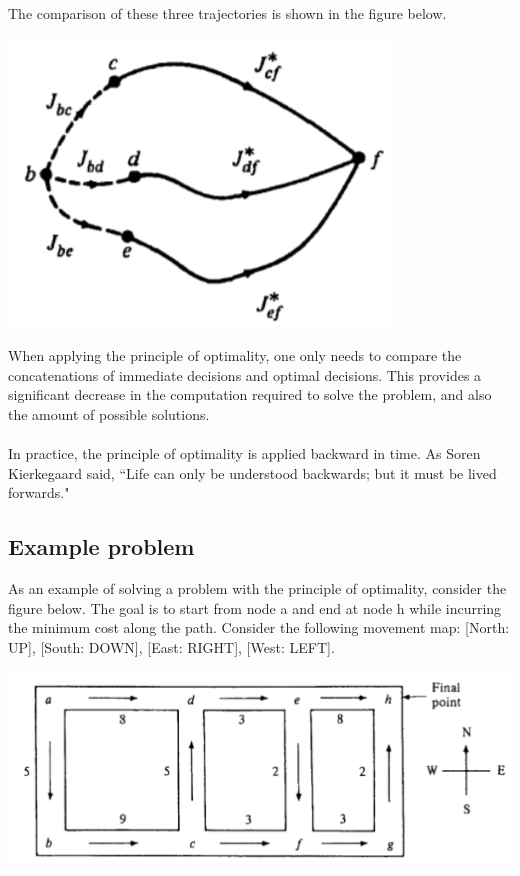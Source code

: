 \documentclass[twoside]{article}
\begin{document}
The comparison of these three trajectories is shown in the figure below.
\begin{center}
\includegraphics[width=0.5 \textwidth]{image4.png}
\end{center}
When applying the principle of optimality, one only needs to compare the concatenations of immediate decisions and optimal decisions. This provides a significant decrease in the computation required to solve the problem, and also the amount of possible solutions.
\\
\\
In practice, the principle of optimality is applied backward in time. As Soren Kierkegaard said, ``Life can only be understood backwards; but it must be lived forwards."
\\ \subsection{Example problem}
As an example of solving a problem with the principle of optimality, consider the figure below. The goal is to start from node a and end at node h while incurring the minimum cost along the path. Consider the following movement map: [North: UP], [South: DOWN], [East: RIGHT], [West: LEFT].
\\
\begin{center}
\includegraphics[width= .95 \textwidth]{image5.png}
\end{center}
\end{document}
